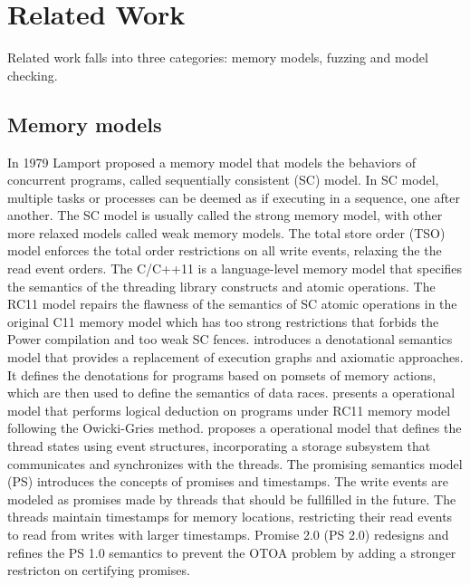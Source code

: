 \chapter{\label{cha:related}Related Work}

Related work falls into three categories: memory models, fuzzing and model checking.


\section{Memory models}

In 1979 Lamport\cite{SC} proposed a memory model that models the behaviors of concurrent programs, called sequentially consistent (SC) model. In SC model, multiple tasks or processes can be deemed as if executing in a sequence, one after another. The SC model is usually called the strong memory model, with other more relaxed models called weak memory models. The total store order (TSO) model\cite{TSO} enforces the total order restrictions on all write events, relaxing the the read event orders. The C/C++11\cite{c++model} is a language-level  memory model that specifies the semantics of the threading library constructs and atomic operations. 
The RC11 model\cite{RC11} repairs the flawness of the semantics of SC atomic operations in the original C11 memory model which has too strong restrictions that forbids the Power compilation and too weak SC fences.
\cite{Kavanagh2018ADA} introduces a denotational semantics model that provides a replacement of execution graphs and axiomatic approaches. It defines the denotations for programs based on pomsets of memory actions, which are then used to define the semantics of data races.
\cite{Owicki-Gries} presents a operational model that performs logical deduction on programs under RC11 memory model following the Owicki-Gries method. 
\cite{wmm2016} proposes a operational model that defines the thread states using event structures, incorporating a storage subsystem that communicates and synchronizes with the threads. 
The promising semantics model (PS)\cite{promise-c++model} introduces the concepts of promises and timestamps. The write events are modeled as promises made by threads that should be fullfilled in the future. The threads maintain timestamps for memory locations, restricting their read events to read from writes with larger timestamps. Promise 2.0 (PS 2.0)\cite{promise2.0-c++model} redesigns and refines the PS 1.0 semantics to prevent the OTOA problem by adding a stronger restricton on certifying promises. 


